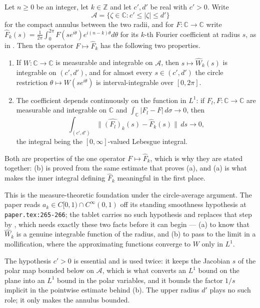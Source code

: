 \begin{helper}
Let $n\ge0$ be an integer, let $k\in\mathbb{Z}$ and let $c',d'$ be real with
$c'>0$.  Write
\[
  \mathcal{A}=\{\zeta\in\mathbb{C}:c'\le|\zeta|\le d'\}
\]
for the compact annulus between the two radii, and for
$F\colon\mathbb{C}\to\mathbb{C}$ write
$\widehat F_k(s)=\frac1{2\pi}\int_0^{2\pi}F(se^{i\theta})e^{i(n-k)\theta}d\theta$
for its $k$-th Fourier coefficient at radius $s$, as in
.  Then the operator $F\mapsto\widehat F_k$ has the
following two properties.
\begin{enumerate}
\item[(a)] If $W\colon\mathbb{C}\to\mathbb{C}$ is measurable and integrable on
  $\mathcal{A}$, then $s\mapsto\widehat W_k(s)$ is integrable on $(c',d')$,
  and for almost every $s\in(c',d')$ the circle restriction
  $\theta\mapsto W(se^{i\theta})$ is interval-integrable over $[0,2\pi]$.
\item[(b)] The coefficient depends continuously on the function in $L^1$: if
  $F_l,F\colon\mathbb{C}\to\mathbb{C}$ are measurable and integrable on
  $\mathbb{C}$ and $\int_{\mathbb{C}}|F_l-F|\,d\sigma\to0$, then
  \[
    \int_{(c',d')}\bigl\|\widehat{(F_l)}_k(s)-\widehat F_k(s)\bigr\|\,ds
    \longrightarrow0,
  \]
  the integral being the $[0,\infty]$-valued Lebesgue integral.
\end{enumerate}

Both are properties of the one operator $F\mapsto\widehat F_k$, which is why
they are stated together: (b) is proved from the same estimate that proves
(a), and (a) is what makes the inner integral defining $\widehat F_k$
meaningful in the first place.

This is the measure-theoretic foundation under the circle-average argument.
The paper reads $a_k\in C[0,1)\cap C^\infty(0,1)$ off its standing smoothness
hypothesis at \texttt{paper.tex:265-266}; the tablet carries no such
hypothesis and replaces that step by , which
needs exactly these two facts before it can begin --- (a) to know that
$\widehat W_k$ is a genuine integrable function of the radius, and (b) to pass
to the limit in a mollification, where the approximating functions converge to
$W$ only in $L^1$.

The hypothesis $c'>0$ is essential and is used twice: it keeps the Jacobian
$s$ of the polar map bounded below on $\mathcal{A}$, which is what converts an
$L^1$ bound on the plane into an $L^1$ bound in the polar variables, and it
bounds the factor $1/s$ implicit in the pointwise estimate behind (b).  The
upper radius $d'$ plays no such role; it only makes the annulus bounded.
\end{helper}
